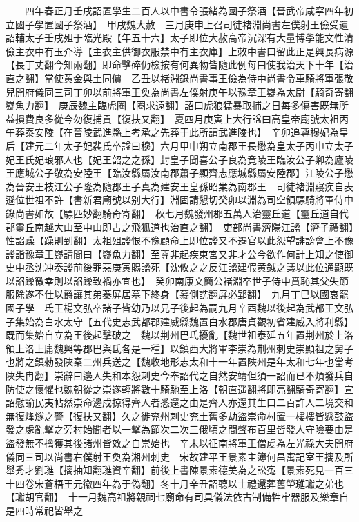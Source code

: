 　　四年春正月壬戌詔置學生二百人以中書令張緒為國子祭酒【晉武帝咸寜四年初立國子學置國子祭酒】　甲戌魏大赦　三月庚申上召司徒褚淵尚書左僕射王儉受遺詔輔太子壬戌殂于臨光殿【年五十六】太子即位大赦高帝沉深有大量博學能文性清儉主衣中有玉介導【主衣主供御衣服禁中有主衣庫】上敇中書曰留此正是興長病源【長丁丈翻今知兩翻】即命擊碎仍檢按有何異物皆隨此例每曰使我治天下十年【治直之翻】當使黄金與土同價　乙丑以褚淵錄尚書事王儉為侍中尚書令車騎將軍張敬兒開府儀同三司丁卯以前將軍王奐為尚書左僕射庚午以豫章王嶷為太尉【騎奇寄翻嶷魚力翻】　庚辰魏主臨虎圈【圈求遠翻】詔曰虎狼猛暴取捕之日每多傷害既無所益損費良多從今勿復捕貢【復扶又翻】　夏四月庚寅上大行諡曰高皇帝廟號太祖丙午葬泰安陵【在晉陵武進縣上考承之先葬于此所謂武進陵也】　辛卯追尊穆妃為皇后【建元二年太子妃裴氏卒諡曰穆】六月甲申朔立南郡王長懋為皇太子丙申立太子妃王氏妃琅邪人也【妃王韶之之孫】封皇子聞喜公子良為竟陵王臨汝公子卿為廬陵王應城公子敬為安陸王【臨汝縣屬汝南郡蕭子顯齊志應城縣屬安陸郡】江陵公子懋為晉安王枝江公子隆為隨郡王子真為建安王皇孫昭業為南郡王　司徒褚淵寢疾自表遜位世祖不許【書新君廟號以别大行】淵固請懇切癸卯以淵為司空領驃騎將軍侍中錄尚書如故【驃匹妙翻騎奇寄翻】　秋七月魏發州郡五萬人治靈丘道【靈丘道自代郡靈丘南越大山至中山即古之飛狐道也治直之翻】　吏部尚書濟陽江謐【濟子禮翻】性諂躁【躁則到翻】太祖殂謐恨不豫顧命上即位謐又不遷官以此怨望誹謗會上不豫謐詣豫章王嶷請間曰【嶷魚力翻】至尊非起疾東宮又非才公今欲作何計上知之使御史中丞沈冲奏謐前後罪惡庚寅賜謐死【沈攸之之反江謐建假黄鉞之議以此位通顯既以諂躁徼幸則以諂躁致禍亦宜也】　癸卯南康文簡公褚淵卒世子侍中賁恥其父失節服除遂不仕以爵讓其弟蓁屏居墓下終身【慕側詵翻屛必郢翻】　九月丁巳以國哀罷國子學　氐王楊文弘卒諸子皆幼乃以兄子後起為嗣九月辛酉魏以後起為武都王文弘子集始為白水太守【五代史志武都郡建威縣魏置白水郡唐貞觀初省建威入將利縣】既而集始自立為王後起擊破之　魏以荆州巴氐擾亂【魏世祖泰延五年置荆州於上洛領上洛上庸魏興等郡巴與氐各是一種】以鎮西大將軍李崇為荆州刺史崇顯祖之舅子也將之鎮勑發陜秦二州兵送之【魏收地形志太和十一年置陜州是年太和七年也當考陜失冉翻】崇辭曰邉人失和本怨刺史今奉詔代之自然安靖但須一詔而已不煩發兵自防使之懷懼也魏朝從之崇遂輕將數十騎馳至上洛【朝直遥翻將即亮翻騎奇寄翻】宣詔慰諭民夷帖然崇命邊戍掠得齊人者悉還之由是齊人亦還其生口二百許人二境交和無復烽燧之警【復扶又翻】久之徙兖州刺史兖土舊多劫盜崇命村置一樓樓皆懸鼓盜發之處亂擊之旁村始聞者以一擊為節次二次三俄頃之間聲布百里皆發人守險要由是盜發無不擒獲其後諸州皆效之自崇始也　辛未以征南將軍王僧䖍為左光祿大夫開府儀同三司以尚書右僕射王奐為湘州刺史　宋故建平王景素主簿何昌㝢記室王摛及所舉秀才劉璡【摛抽知翻璡資辛翻】前後上書陳景素德美為之訟寃【景素死見一百三十四卷宋蒼梧王元徽四年為于偽翻】冬十月辛丑詔聽以士禮還葬舊塋璡瓛之弟也【瓛胡官翻】　十一月魏高祖將親祠七廟命有司具儀法依古制備牲牢器服及樂章自是四時常祀皆舉之


